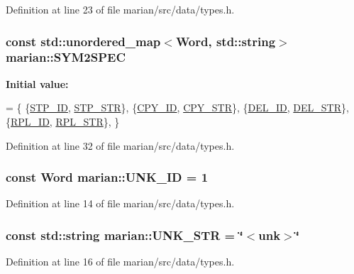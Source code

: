 Definition at line 23 of file marian/src/data/types.\+h.

\subsubsection[{\texorpdfstring{S\+Y\+M2\+S\+P\+EC}{SYM2SPEC}}]{\setlength{\rightskip}{0pt plus 5cm}const std\+::unordered\+\_\+map$<${\bf Word}, std\+::string$>$ marian\+::\+S\+Y\+M2\+S\+P\+EC}\hypertarget{namespacemarian_a70398af3e3d1cc14ff372edcdc1a2595}{}\label{namespacemarian_a70398af3e3d1cc14ff372edcdc1a2595}
{\bfseries Initial value\+:}
\begin{DoxyCode}
= \{
    \{\hyperlink{namespacemarian_a5a9abba7ca69af7bf465e68f8f7169c5}{STP\_ID}, \hyperlink{namespacemarian_ac2ced42d12025e2b9688b345ac777ea7}{STP\_STR}\}, \{\hyperlink{namespacemarian_a332a04943d2fc4bba824afc099e46190}{CPY\_ID}, \hyperlink{namespacemarian_aafe70f6fe2652d0c8712f08bc4e2c8f6}{CPY\_STR}\}, \{\hyperlink{namespacemarian_a3602e294027f4df7aeba04dd25e83db6}{DEL\_ID}, 
      \hyperlink{namespacemarian_aa9c98f79752cd2294cae93a90ffcf9d3}{DEL\_STR}\}, \{\hyperlink{namespacemarian_ae421bed2a0160f392a3c21bed9cabc73}{RPL\_ID}, \hyperlink{namespacemarian_a0609886bc1d9c2f4fc75e5e9fc6905ad}{RPL\_STR}\},
\}
\end{DoxyCode}


Definition at line 32 of file marian/src/data/types.\+h.

\subsubsection[{\texorpdfstring{U\+N\+K\+\_\+\+ID}{UNK_ID}}]{\setlength{\rightskip}{0pt plus 5cm}const {\bf Word} marian\+::\+U\+N\+K\+\_\+\+ID = 1}\hypertarget{namespacemarian_abe23e32294ac45b7fe50b5ee8d7da9ba}{}\label{namespacemarian_abe23e32294ac45b7fe50b5ee8d7da9ba}


Definition at line 14 of file marian/src/data/types.\+h.

\subsubsection[{\texorpdfstring{U\+N\+K\+\_\+\+S\+TR}{UNK_STR}}]{\setlength{\rightskip}{0pt plus 5cm}const std\+::string marian\+::\+U\+N\+K\+\_\+\+S\+TR = \char`\"{}$<$unk$>$\char`\"{}}\hypertarget{namespacemarian_a85fabda4ef9ec625d0c992f81292dc92}{}\label{namespacemarian_a85fabda4ef9ec625d0c992f81292dc92}


Definition at line 16 of file marian/src/data/types.\+h.


